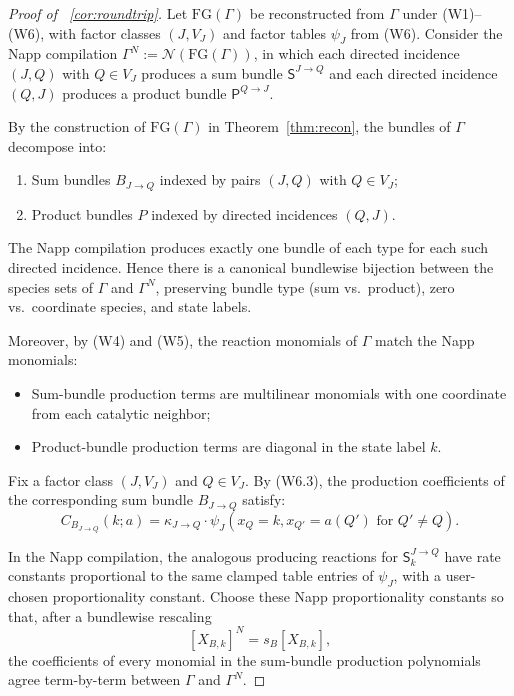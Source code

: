 \documentclass[10pt,a4paper]{amsart}
\begin{document}
\begin{proof}[Proof of ~\ref{cor:roundtrip}]
Let $\mathrm{FG}(\Gamma)$ be reconstructed from $\Gamma$ under (W1)--(W6), with factor 
classes $(J, V_J)$ and factor tables $\psi_J$ from (W6). Consider the Napp compilation 
$\Gamma^N := \mathcal{N}(\mathrm{FG}(\Gamma))$, in which each directed incidence 
$(J, Q)$ with $Q \in V_J$ produces a sum bundle $\mathsf{S}^{J \to Q}$ and each 
directed incidence $(Q, J)$ produces a product bundle $\mathsf{P}^{Q \to J}$.

By the construction of $\mathrm{FG}(\Gamma)$ in Theorem~\ref{thm:recon}, 
the bundles of $\Gamma$ decompose into:
\begin{enumerate}
\item Sum bundles $B_{J \to Q}$ indexed by pairs $(J, Q)$ with $Q \in V_J$;
\item Product bundles $P$ indexed by directed incidences $(Q, J)$.
\end{enumerate}

The Napp compilation produces exactly one bundle of each type for each such directed 
incidence. Hence there is a canonical bundlewise bijection between the species sets 
of $\Gamma$ and $\Gamma^N$, preserving bundle type (sum vs.\ product), zero vs.\ 
coordinate species, and state labels.

Moreover, by (W4) and (W5), the reaction monomials of $\Gamma$ match the Napp monomials:
\begin{itemize}
\item Sum-bundle production terms are multilinear monomials with one coordinate 
from each catalytic neighbor;
\item Product-bundle production terms are diagonal in the state label $k$.
\end{itemize}

Fix a factor class $(J, V_J)$ and $Q \in V_J$. By (W6.3), the production coefficients 
of the corresponding sum bundle $B_{J \to Q}$ satisfy:
\[
C_{B_{J \to Q}}(k; a) = \kappa_{J \to Q} \cdot \psi_J(x_Q = k, x_{Q'} = a(Q') \text{ for } Q' \neq Q).
\]

In the Napp compilation, the analogous producing reactions for $\mathsf{S}^{J \to Q}_k$ 
have rate constants proportional to the same clamped table entries of $\psi_J$, with 
a user-chosen proportionality constant. Choose these Napp proportionality constants 
so that, after a bundlewise rescaling
\[
[X_{B,k}]^N = s_B [X_{B,k}],
\]
the coefficients of every monomial in the sum-bundle production polynomials agree 
term-by-term between $\Gamma$ and $\Gamma^N$.


\end{proof}
\end{document}
